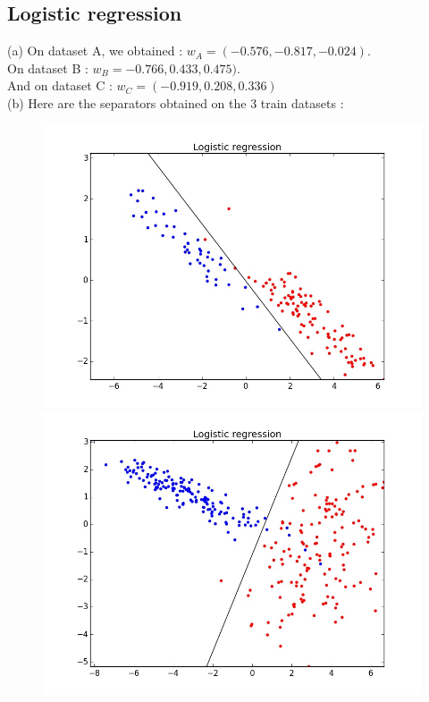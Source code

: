 \documentclass[11pt,a4paper]{article}
\begin{document}
\subsection{Logistic regression}
%
\hspace*{-6mm}(a) On dataset A, we obtained : $w_A = (-0.576, -0.817, -0.024)$.
\\On dataset B : $w_B = -0.766, 0.433, 0.475)$.
\\And on dataset C : $w_C = (-0.919, 0.208, 0.336)$
%
%
\\[5mm](b) Here are the separators obtained on the 3 train datasets : 

\begin{figure}[H]
\centering
\noindent\includegraphics[scale=0.2]{images/logistic_A.jpeg}
\noindent\includegraphics[scale=0.2]{images/logistic_B.jpeg}

\end{figure}
\end{document}
